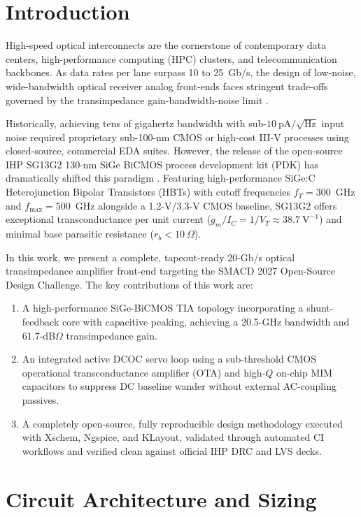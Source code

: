 \documentclass[conference]{IEEEtran}
\begin{document}
\section{Introduction}
High-speed optical interconnects are the cornerstone of contemporary data centers, high-performance computing (HPC) clusters, and telecommunication backbones. As data rates per lane surpass 10 to 25~Gb/s, the design of low-noise, wide-bandwidth optical receiver analog front-ends faces stringent trade-offs governed by the transimpedance gain-bandwidth-noise limit \cite{razavi_rf, sackinger}. 

Historically, achieving tens of gigahertz bandwidth with sub-$10~\text{pA}/\sqrt{\text{Hz}}$ input noise required proprietary sub-100-nm CMOS or high-cost III-V processes using closed-source, commercial EDA suites. However, the release of the open-source IHP SG13G2 130-nm SiGe BiCMOS process development kit (PDK) has dramatically shifted this paradigm \cite{ihp_pdk}. Featuring high-performance SiGe:C Heterojunction Bipolar Transistors (HBTs) with cutoff frequencies $f_T = 300$~GHz and $f_{\max} = 500$~GHz alongside a 1.2-V/3.3-V CMOS baseline, SG13G2 offers exceptional transconductance per unit current ($g_m / I_C = 1/V_T \approx 38.7~\text{V}^{-1}$) and minimal base parasitic resistance ($r_b < 10~\Omega$).

In this work, we present a complete, tapeout-ready 20-Gb/s optical transimpedance amplifier front-end targeting the SMACD 2027 Open-Source Design Challenge. The key contributions of this work are:
\begin{enumerate}
    \item A high-performance SiGe-BiCMOS TIA topology incorporating a shunt-feedback core with capacitive peaking, achieving a 20.5-GHz bandwidth and 61.7-dB$\Omega$ transimpedance gain.
    \item An integrated active DCOC servo loop using a sub-threshold CMOS operational transconductance amplifier (OTA) and high-$Q$ on-chip MIM capacitors to suppress DC baseline wander without external AC-coupling passives.
    \item A completely open-source, fully reproducible design methodology executed with Xschem, Ngspice, and KLayout, validated through automated CI workflows and verified clean against official IHP DRC and LVS decks.
\end{enumerate}

\section{Circuit Architecture and Sizing}
\end{document}
